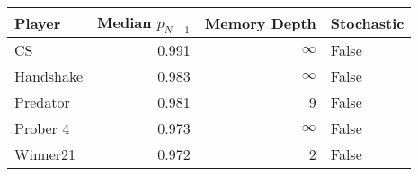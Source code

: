 \begin{tabular}{lrrl}
\toprule
    Player &  Median $p_{N-1}$ &  Memory Depth & Stochastic \\
\midrule
        CS &             0.991 &            \(\infty\) &      False \\
 Handshake &             0.983 &            \(\infty\) &      False \\
  Predator &             0.981 &             9 &      False \\
  Prober 4 &             0.973 &            \(\infty\) &      False \\
  Winner21 &             0.972 &             2 &      False \\
\bottomrule
\end{tabular}
